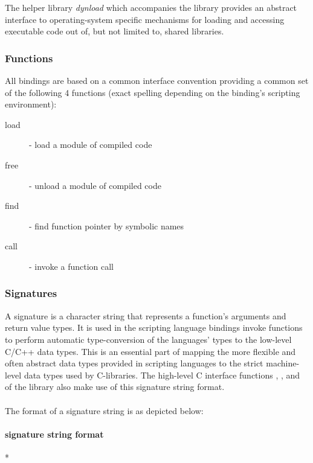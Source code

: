 The helper library \emph{dynload} which accompanies the 
library provides an abstract interface to operating-system specific mechanisms
for loading and accessing executable code out of, but not limited to, shared
libraries.

\subsubsection{Functions}

All bindings are based on a common interface convention providing a common set
of the following 4 functions (exact spelling depending on the binding's scripting
environment):
\begin{description}
\item [load] - load a module of compiled code
\item [free] - unload a module of compiled code
\item [find] - find function pointer by symbolic names
\item [call] - invoke a function call
\end{description}

\pagebreak

\subsubsection{Signatures}

A signature is a character string that represents a function's arguments and
return value types. It is used in the scripting language bindings invoke
functions to perform automatic type-conversion of the languages' types to the
low-level C/C++ data types.
This is an essential part of mapping the more flexible and often abstract data
types provided in scripting languages to the strict machine-level data types
used by C-libraries.
The high-level C interface functions , ,
 and  of the  library also make
use of this signature string format.\\
\\
The format of a  signature string is as depicted below:


\paragraph{ signature string format}

\begin{center}
* \sigchar{)}  \\
\end{center}

